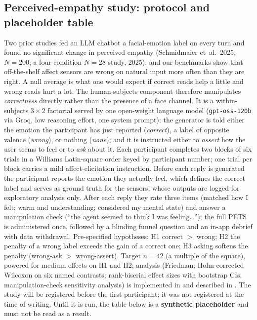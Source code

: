 \documentclass[sigconf,nonacm]{acmart}
\begin{document}
  \subsection{Perceived-empathy study: protocol and placeholder table}\label{sec:study}
  Two prior studies fed an LLM chatbot a facial-emotion label on every turn and found no significant change in perceived empathy (Schmidmaier et~al.\ 2025, $N\!=\!200$; a four-condition $N\!=\!28$ study, 2025), and our benchmarks show that off-the-shelf affect sensors are wrong on natural input more often than they are right. A null average is what one would expect if correct reads help a little and wrong reads hurt a lot. The human-subjects component therefore manipulates \emph{correctness} directly rather than the presence of a face channel. It is a within-subjects $3\!\times\!2$ factorial served by one open-weight language model (\texttt{gpt-oss-120b} via Groq, low reasoning effort, one system prompt): the generator is told either the emotion the participant has just reported (\emph{correct}), a label of opposite valence (\emph{wrong}), or nothing (\emph{none}); and it is instructed either to \emph{assert} how the user seems to feel or to \emph{ask} about it. Each participant completes two blocks of six trials in a Williams Latin-square order keyed by participant number; one trial per block carries a mild affect-elicitation instruction. Before each reply is generated the participant reports the emotion they actually feel, which defines the correct label and serves as ground truth for the sensors, whose outputs are logged for exploratory analysis only. After each reply they rate three items (matched how I felt; warm and understanding; considered my mental state) and answer a manipulation check (``the agent seemed to think I was feeling\ldots''); the full PETS~\cite{schmidmaier2024pets} is administered once, followed by a blinding funnel question and an in-app debrief with data withdrawal. Pre-specified hypotheses: H1 correct $>$ wrong; H2 the penalty of a wrong label exceeds the gain of a correct one; H3 asking softens the penalty (wrong-ask $>$ wrong-assert). Target $n\!=\!42$ (a multiple of the square), powered for medium effects on H1 and H2; analysis (Friedman; Holm-corrected Wilcoxon on six named contrasts; rank-biserial effect sizes with bootstrap CIs; manipulation-check sensitivity analysis) is implemented in  and described in . The study will be registered before the first participant; it was not registered at the time of writing. Until it is run, the table below is a \textbf{synthetic placeholder} and must not be read as a result.
\end{document}
